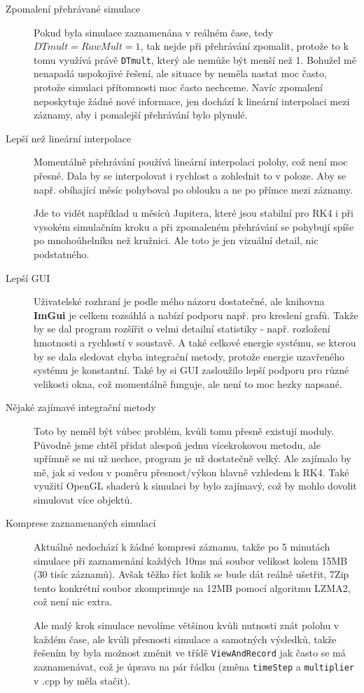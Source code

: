 \begin{description}
	\item[Zpomalení přehrávané simulace] Pokud byla simulace zaznamenána v reálném čase, tedy $ DTmult=RawMult=1 $, tak nejde při přehrávání zpomalit, protože to k tomu využívá právě \texttt{DTmult}, který ale nemůže být menší než 1. Bohužel mě nenapadá uspokojivé řešení, ale situace by neměla nastat moc často, protože simulaci přítomnosti moc často nechceme. Navíc zpomalení neposkytuje žádné nové informace, jen dochází k lineární interpolaci mezi záznamy, aby i pomalejší přehrávání bylo plynulé.
	\item[Lepší než lineární interpolace] Momentálně přehrávání používá lineární interpolaci polohy, což není moc přesné. Dala by se interpolovat i rychlost a zohlednit to v poloze. Aby se např. obíhající měsíc pohyboval po oblouku a ne po přímce mezi záznamy.
	
	Jde to vidět například u měsíců Jupitera, které jsou stabilní pro RK4 i při vysokém simulačním kroku a při zpomaleném přehrávání se pohybují spíše po mnohoúhelníku než kružnici. Ale toto je jen vizuální detail, nic podstatného.
	
	\item[Lepší GUI] Uživatelské rozhraní je podle mého názoru dostatečné, ale knihovna \textbf{ImGui} je celkem rozsáhlá a nabízí podporu např. pro kreslení grafů. Takže by se dal program rozšířit o velmi detailní statistiky - např. rozložení hmotnosti a rychlostí v soustavě. A také celkové energie systému, se kterou by se dala sledovat chyba integrační metody, protože energie uzavřeného systému je konstantní. Také by si GUI zasloužilo lepší podporu pro různé velikosti okna, což momentálně funguje, ale není to moc hezky napsané.
	\item[Nějaké zajímavé integrační metody] Toto by neměl být vůbec problém, kvůli tomu přesně existují moduly. Původně jsme chtěl přidat alespoň jednu vícekrokovou metodu, ale upřímně se mi už nechce, program je už dostatečně velký. Ale zajímalo by mě, jak si vedou v poměru přesnost/výkon hlavně vzhledem k RK4.
	Také využití OpenGL shaderů k simulaci by bylo zajímavý, což by mohlo dovolit simulovat více objektů.
	\item[Komprese zaznamenaných simulací] Aktuálně nedochází k žádné kompresi záznamu, takže po 5 minutách simulace při zaznamenání každých 10ms má soubor velikost kolem 15MB (30 tisíc záznamů). Avšak těžko říct kolik se bude dát reálně ušetřit, 7Zip tento konkrétní soubor zkomprimuje na 12MB pomocí algoritmu LZMA2, což není nic extra. 
	
	Ale malý krok simulace nevolíme většinou kvůli nutnosti znát polohu v každém čase, ale kvůli přesnosti simulace a samotných výsledků, takže řešením by byla možnost změnit ve třídě \texttt{ViewAndRecord} jak často se má zaznamenávat, což je úprava na pár řádku (změna \texttt{timeStep} a \texttt{multiplier} v .cpp by měla stačit).
	
\end{description}